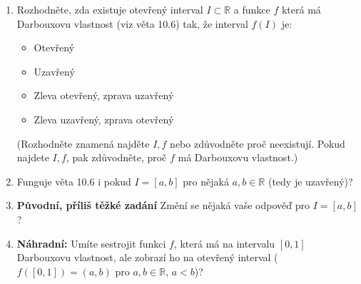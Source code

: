\begin{enumerate}

	\item  Rozhodněte, zda existuje otevřený interval $I \subset \mathbb{R}$ a funkce $f$ která má Darbouxovu vlastnost (viz věta 10.6) tak, že interval $f(I)$ je:

		\begin{itemize}

			\item  Otevřený

			\item  Uzavřený

			\item  Zleva otevřený, zprava uzavřený

			\item  Zleva uzavřený, zprava otevřený

		\end{itemize}

		(Rozhodněte znamená najděte $I, f$ nebo zdůvodněte proč neexistují. Pokud najdete $I, f$, pak zdůvodněte, proč $f$ má Darbouxovu vlastnost.)

	\item  Funguje věta 10.6 i pokud $I = [a, b]$ pro nějaká $a, b \in \mathbb{R}$ (tedy je uzavřený)?

	\item  \textbf{Původní, příliš těžké zadání} Změní se nějaká vaše odpověď pro $I = [a, b]$?

	\item  \textbf{Náhradní:} Umíte sestrojit funkci $f$, která má na intervalu $[0, 1]$ Darbouxovu vlastnost, ale zobrazí ho na otevřený interval ($f([0, 1]) = (a, b)$ pro $a, b \in \mathbb{R}$, $a < b$)?

\end{enumerate}

